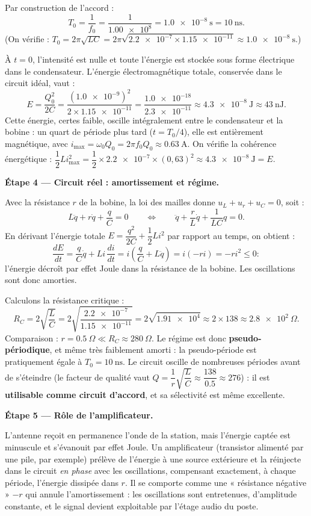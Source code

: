 \documentclass[11pt]{article}
\newcommand{\cle}[1]{{\popxbold\color{popdark}#1}}
\begin{document}
\begin{exoresolu}
Par construction de l'accord :
\[
T_0 = \frac{1}{f_0} = \frac{1}{\num{1,00e8}} = \num{1,0e-8}~\text{s} = \num{10}~\text{ns}.
\]
(On vérifie : $T_0 = 2\pi\sqrt{LC} = 2\pi\sqrt{\num{2,2e-7}\times\num{1,15e-11}} \approx \num{1,0e-8}~\text{s}$.)

À $t = 0$, l'intensité est nulle et toute l'énergie est stockée sous forme électrique dans le condensateur. L'énergie électromagnétique totale, conservée dans le circuit idéal, vaut :
\[
E = \frac{Q_0^2}{2C} = \frac{(\num{1,0e-9})^2}{2\times\num{1,15e-11}} = \frac{\num{1,0e-18}}{\num{2,3e-11}} \approx \num{4,3e-8}~\text{J} \approx \num{43}~\text{nJ}.
\]
Cette énergie, certes faible, oscille intégralement entre le condensateur et la bobine : un quart de période plus tard ($t = T_0/4$), elle est entièrement magnétique, avec $i_{\max} = \omega_0 Q_0 = 2\pi f_0 Q_0 \approx \num{0,63}~\text{A}$. On vérifie la cohérence énergétique : $\dfrac{1}{2}Li_{\max}^2 = \dfrac{1}{2}\times\num{2,2e-7}\times(0{,}63)^2 \approx \num{4,3e-8}~\text{J} = E$.

\textbf{Étape 4 — Circuit réel : amortissement et régime.}

Avec la résistance $r$ de la bobine, la loi des mailles donne $u_L + u_r + u_C = 0$, soit :
\[
L\ddot{q} + r\dot{q} + \frac{q}{C} = 0
\qquad\Longleftrightarrow\qquad
\ddot{q} + \frac{r}{L}\dot{q} + \frac{1}{LC}q = 0.
\]
En dérivant l'énergie totale $E = \dfrac{q^2}{2C} + \dfrac{1}{2}Li^2$ par rapport au temps, on obtient :
\[
\frac{dE}{dt} = \frac{q}{C}\dot{q} + Li\,\frac{di}{dt} = i\left(\frac{q}{C} + L\ddot{q}\right) = i(-ri) = -ri^2 \leq 0 :
\]
l'énergie décroît par \cle{effet Joule} dans la résistance de la bobine. Les oscillations sont donc amorties.

Calculons la résistance critique :
\[
R_C = 2\sqrt{\frac{L}{C}} = 2\sqrt{\frac{\num{2,2e-7}}{\num{1,15e-11}}} = 2\sqrt{\num{1,91e4}} \approx 2\times 138 \approx \num{2,8e2}~\Omega.
\]
Comparaison : $r = \num{0,5}~\Omega \ll R_C \approx \num{280}~\Omega$. Le régime est donc \textbf{pseudo-périodique}, et même très faiblement amorti : la pseudo-période est pratiquement égale à $T_0 = \num{10}~\text{ns}$. Le circuit oscille de nombreuses périodes avant de s'éteindre (le facteur de qualité vaut $Q = \dfrac{1}{r}\sqrt{\dfrac{L}{C}} \approx \dfrac{138}{\num{0,5}} \approx 276$) : il est \textbf{utilisable comme circuit d'accord}, et sa sélectivité est même excellente.

\textbf{Étape 5 — Rôle de l'amplificateur.}

L'antenne reçoit en permanence l'onde de la station, mais l'énergie captée est minuscule et s'évanouit par effet Joule. Un amplificateur (transistor alimenté par une pile, par exemple) prélève de l'énergie à une source extérieure et la réinjecte dans le circuit \emph{en phase} avec les oscillations, compensant exactement, à chaque période, l'énergie dissipée dans $r$. Il se comporte comme une « résistance négative » $-r$ qui annule l'amortissement : les oscillations sont \cle{entretenues}, d'amplitude constante, et le signal devient exploitable par l'étage audio du poste.


\end{exoresolu}
\end{document}
